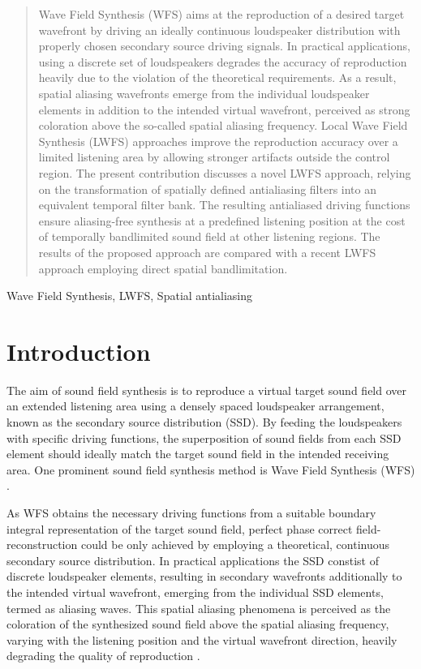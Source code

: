 \documentclass[conference]{IEEEtran}
\begin{document}
\begin{abstract}
    Wave Field Synthesis (WFS) aims at the reproduction of a desired target wavefront by driving an ideally continuous loudspeaker distribution with properly chosen secondary source driving signals.
    In practical applications, using a discrete set of loudspeakers degrades the accuracy of reproduction heavily due to the violation of the theoretical requirements.
    As a result, spatial aliasing wavefronts emerge from the individual loudspeaker elements in addition to the intended virtual wavefront, perceived as strong coloration above the so-called spatial aliasing frequency.
    Local Wave Field Synthesis (LWFS) approaches improve the reproduction accuracy over a limited listening area by allowing stronger artifacts outside the control region.
    The present contribution discusses a novel LWFS approach, relying on the transformation of spatially defined antialiasing filters into an equivalent temporal filter bank.
    The resulting antialiased driving functions ensure aliasing-free synthesis at a predefined listening position at the cost of temporally bandlimited sound field at other listening regions.
    The results of the proposed approach are compared with a recent LWFS approach employing direct spatial bandlimitation.
\end{abstract}

\begin{IEEEkeywords}
    Wave Field Synthesis, LWFS, Spatial antialiasing
\end{IEEEkeywords}

\section{Introduction}
The aim of sound field synthesis is to reproduce a virtual target sound field over an extended listening area using a densely spaced loudspeaker arrangement, known as the secondary source distribution (SSD).
By feeding the loudspeakers with specific driving functions, the superposition of sound fields from each SSD element should ideally match the target sound field in the intended receiving area.
One prominent sound field synthesis method is Wave Field Synthesis (WFS) \cite{Berkhout1993:Acoustic_control_by_WFS, Start1997:phd}. 

As WFS obtains the necessary driving functions from a suitable boundary integral representation of the target sound field, perfect phase correct field-reconstruction could be only achieved by employing a theoretical, continuous secondary source distribution.
In practical applications the SSD constist of discrete loudspeaker elements, resulting in secondary wavefronts additionally to the intended virtual wavefront, emerging from the individual SSD elements, termed as aliasing waves.
This spatial aliasing phenomena is perceived as the coloration of the synthesized sound field above the spatial aliasing frequency, varying with the listening position and the virtual wavefront direction, heavily degrading the quality of reproduction \cite{8371275, 8611109}.
\end{document}
